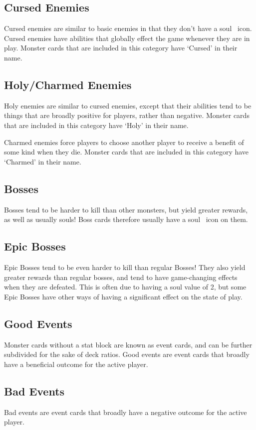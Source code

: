 \documentclass[
  fontsize=10pt,
  paper=a5,
  version=last,
  chapterprefix=true,
  bindingoffset=5mm,
  ]{scrbook}
\newcommand*{\inlineicon}[1]{%
    \raisebox{-.3\baselineskip}{%
        \smash{%
            \texttt{[image: \#1]}%
        }%
    }%
}
\newcommand{\soul}{\inlineicon{./assets/ms-soul.png}}
\begin{document}
    \subsection*{Cursed Enemies}
    Cursed enemies are similar to basic enemies in that they don’t have a soul\soul\ icon. Cursed enemies have abilities that globally effect the game whenever they are in play. Monster cards that are included in this category have ‘Cursed’ in their name.
    \subsection*{Holy/Charmed Enemies}
    Holy enemies are similar to cursed enemies, except that their abilities tend to be things that are broadly positive for players, rather than negative. Monster cards that are included in this category have ‘Holy’ in their name.
    
    Charmed enemies force players to choose another player to receive a benefit of some kind when they die. Monster cards that are included in this category have ‘Charmed’ in their name.
    \subsection*{Bosses}
    Bosses tend to be harder to kill than other monsters, but yield greater rewards, as well as usually souls! Boss cards therefore usually have a soul\soul\ icon on them.
    \subsection*{Epic Bosses}
    Epic Bosses tend to be even harder to kill than regular Bosses! They also yield greater rewards than regular bosses, and tend to have game-changing effects when they are defeated. This is often due to having a soul value of 2, but some Epic Bosses have other ways of having a significant effect on the state of play.
    \subsection*{Good Events}
    Monster cards without a stat block are known as event cards, and can be further subdivided for the sake of deck ratios. Good events are event cards that broadly have a beneficial outcome for the active player.
    \subsection*{Bad Events}
    Bad events are event cards that broadly have a negative outcome for the active player.
    
\end{document}
